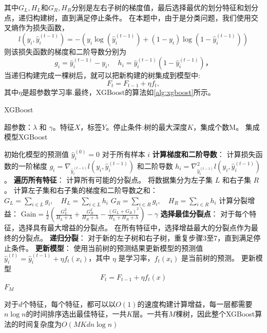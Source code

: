 其中$G_L,H_L$和$G_R,H_R$分别是左右子树的梯度值，最后选择最优的划分特征和划分点，递归构建树，直到满足停止条件。
在本题中，由于是分类问题，我们使用交叉熵作为损失函数，
\begin{equation}
	l(y_i,\hat{y}_i^{(t-1)})=-\left(y_i\log(\hat{y}_i^{(t-1)})+(1-y_i)\log(1-\hat{y}_i^{(t-1)})\right)
\end{equation}
则该损失函数的梯度和二阶导数分别为
\begin{equation}
	g_i=\hat{y}_i^{(t-1)}-y_i ,\quad h_i=\hat{y}_i^{(t-1)}(1-\hat{y}_i^{(t-1)})，
\end{equation}
当递归构建完成一棵树后，就可以把新构建的树集成到模型中:
\begin{equation}
	F_t=F_{t-1}+\eta f_t,
\end{equation}
其中$\eta$是超参数学习率.最终，XGBoost的算法如\autoref{alg:xgboost}所示。
\begin{breakablealgorithm}
	\caption{XGBoost}
	\label{alg:xgboost}
	\begin{algorithmic}[1]
		\REQUIRE 超参数：$\lambda$ 和 $\gamma$。特征$X$，标签$Y$。停止条件:树的最大深度$K$，集成个数M。
		\ENSURE 集成模型XGBoost

		\STATE 初始化模型的预测值 $\hat{y}_i^{(0)} = 0$ 对于所有样本 $i$
		    \STATE \textbf{计算梯度和二阶导数}：
		        \STATE 计算损失函数的一阶梯度 $g_i = \nabla_{\hat{y}_i^{(t-1)}} l(y_i, \hat{y}_i^{(t-1)})$ 和二阶导数 $h_i = \nabla_{\hat{y}_i^{(t-1)}}^2 l(y_i, \hat{y}_i^{(t-1)})$。
		    \ENDFOR
		    \STATE \textbf{遍历所有特征}：
		        \STATE 计算所有可能的分裂点。
		            \STATE 将数据集分为左子集 $L$ 和右子集 $R$。
		            \STATE 计算左子集和右子集的梯度和二阶导数之和：
		            \STATE $G_L = \sum_{i \in L} g_i, \quad H_L = \sum_{i \in L} h_i$
		            \STATE $G_R = \sum_{i \in R} g_i, \quad H_R = \sum_{i \in R} h_i$
		            \STATE 计算分裂增益：
		            \STATE $\text{Gain} = \frac{1}{2}\left(\frac{G_L^2}{H_L + \lambda} + \frac{G_R^2}{H_R + \lambda} - \frac{(G_L + G_R)^2}{H_L + H_R + \lambda}\right) - \gamma$
		        \ENDFOR
		    \ENDFOR
		    \STATE \textbf{选择最佳分裂点}：
		    \STATE 对于每个特征，选择具有最大增益的分裂点。
		    \STATE 在所有特征中，选择增益最大的分裂点作为最终的分裂点。
		    \STATE \textbf{递归分裂}：
		    \STATE 对于新的左子树和右子树，重复步骤3至7，直到满足停止条件。
		    \STATE \textbf{更新模型}：
		    \STATE 使用当前树的预测结果更新模型的预测值 $\hat{y}_i^{(t)} = \hat{y}_i^{(t-1)} + \eta f_t(x_i)$，其中 $\eta$ 是学习率，$f_t(x_i)$ 是当前树的预测。
			\STATE 更新模型
		     \[
			 F_t=F_{t-1}+\eta f_t(x)
			 \]
		\ENDFOR
		\RETURN $F_M$
	\end{algorithmic}
\end{breakablealgorithm}
\par
对于$d$个特征，每个特征，都可以以$O(1)$的速度构建计算增益，每一层都需要$n\log n$的时间排序选出最佳特征，一共$K$层。一共有$M$棵树，因此整个XGBoost算法的时间复杂度为$O(MKdn\log{n})$
\vspace*{1cm}
\newpage

